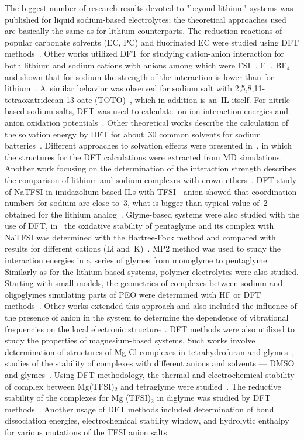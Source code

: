The biggest number of research results devoted to "beyond lithium" systems was published for liquid sodium-based electrolytes; the theoretical approaches used are basically the same as for lithium counterparts. The reduction reactions of popular carbonate solvents (EC, PC) and fluorinated EC were studied using DFT methods~\cite{na-dft-1,na-dft-2}. Other works utilized DFT for studying cation-anion interaction for both lithium and sodium cations with anions among which were FSI$^{-}$, F$^{-}$, BF$_4^{-}$ and shown that for sodium the strength of the interaction is lower than for lithium~\cite{na-dft-3,na-dft-4}. A~similar behavior was observed for sodium salt with 2,5,8,11-tetraoxatridecan-13-oate (TOTO)~\cite{na-dft-5}, which in addition is an~IL itself. For nitrile-based sodium salts, DFT was used to calculate ion-ion interaction energies and anion oxidation potentials~\cite{na-dft-6}. Other theoretical works describe the calculation of the solvation energy by DFT for about~30 common solvents for sodium batteries~\cite{na-dft-7,na-dft-8}. Different approaches to solvation effects were presented in~\cite{na-dft-9}, in which the structures for the DFT calculations were extracted from MD simulations. Another work focusing on the determination of the interaction strength describes the comparison of lithium and sodium complexes with crown ethers~\cite{na-dft-10}. DFT study of NaTFSI in imidazolium-based ILs with TFSI$^{-}$ anion showed that coordination numbers for sodium are close to~3, what is bigger than typical value of~2 obtained for the lithium analog~\cite{na-il-5}. Glyme-based systems were also studied with the use of DFT, in~\cite{na-dft-13} the oxidative stability of pentaglyme and its complex with NaTFSI was determined with the Hartree-Fock method and compared with results for different cations (Li and~K)~\cite{na-dft-14}. MP2 method was used to study the interaction energies in a~series of glymes from monoglyme to pentaglyme~\cite{na-dft-15,vibrational-exp-2,na-dft-16}. Similarly as for the lithium-based systems, polymer electrolytes were also studied. Starting with small models, the geometries of complexes between sodium and oligoglymes simulating parts of PEO were determined with HF or DFT methods~\cite{na-dft-17,na-dft-18,na-dft-19}. Other works extended this approach and also included the influence of the presence of anion in the system to determine the dependence of vibrational frequencies on the local electronic structure~\cite{na-dft-20,na-dft-21,na-dft-22,na-dft-23}. DFT methods were also utilized to study the properties of magnesium-based systems. Such works involve determination of structures of Mg-Cl complexes in tetrahydrofuran and glymes~\cite{mg-dft-1}, studies of the stability of complexes with different anions and solvents --- DMSO~\cite{mg-dft-2} and glymes~\cite{mg-dft-3}. Using DFT methodology, the thermal and electrochemical stability of complex between Mg(TFSI)$_2$ and tetraglyme were studied~\cite{na-dft-15}. The reductive stability of the complexes for Mg (TFSI)$_2$ in diglyme was studied by DFT methods~\cite{mg-dft-5}. Another usage of DFT methods included determination of bond dissociation energies, electrochemical stability window, and hydrolytic enthalpy for various mutations of the TFSI anion salts~\cite{mg-dft-6}.

